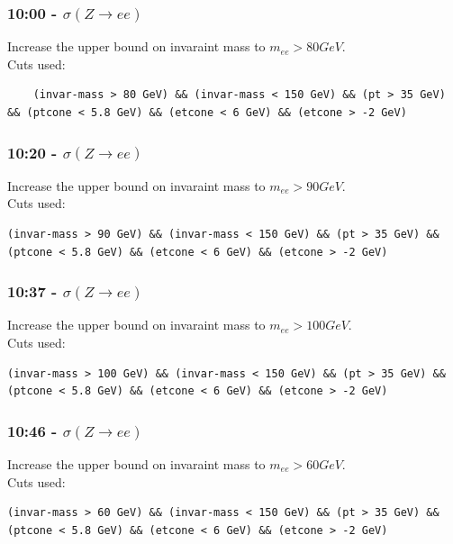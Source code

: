 \subsubsection*{10:00 - $\sigma (Z \rightarrow ee)$ }
Increase the upper bound on invaraint mass to $m_{ee} > 80 GeV$.
\\
Cuts used:
\begin{lstlisting}
    (invar-mass > 80 GeV) && (invar-mass < 150 GeV) && (pt > 35 GeV) && (ptcone < 5.8 GeV) && (etcone < 6 GeV) && (etcone > -2 GeV)
\end{lstlisting}



\subsubsection*{10:20 - $\sigma (Z \rightarrow ee)$ }
Increase the upper bound on invaraint mass to $m_{ee} > 90 GeV$.
\\
Cuts used:
\begin{lstlisting}
(invar-mass > 90 GeV) && (invar-mass < 150 GeV) && (pt > 35 GeV) && (ptcone < 5.8 GeV) && (etcone < 6 GeV) && (etcone > -2 GeV)
\end{lstlisting}

\subsubsection*{10:37 - $\sigma (Z \rightarrow ee)$ }
Increase the upper bound on invaraint mass to $m_{ee} > 100 GeV$.
\\
Cuts used:
\begin{lstlisting}
(invar-mass > 100 GeV) && (invar-mass < 150 GeV) && (pt > 35 GeV) && (ptcone < 5.8 GeV) && (etcone < 6 GeV) && (etcone > -2 GeV)
\end{lstlisting}

\subsubsection*{10:46 - $\sigma (Z \rightarrow ee)$ }
Increase the upper bound on invaraint mass to $m_{ee} > 60 GeV$.
\\
Cuts used:
\begin{lstlisting}
(invar-mass > 60 GeV) && (invar-mass < 150 GeV) && (pt > 35 GeV) && (ptcone < 5.8 GeV) && (etcone < 6 GeV) && (etcone > -2 GeV)
\end{lstlisting}

